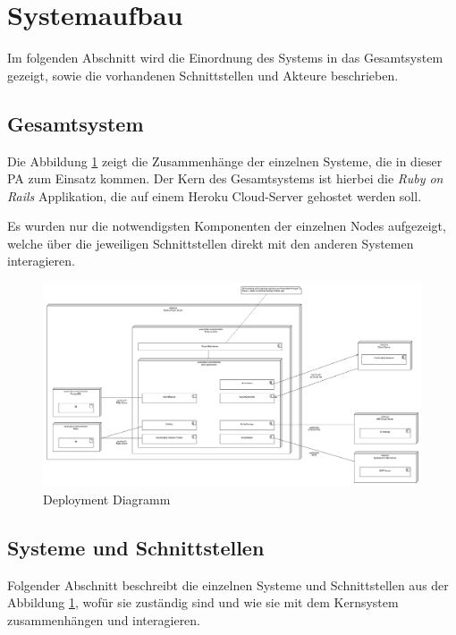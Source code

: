 \newpage

\section{Systemaufbau}

Im folgenden Abschnitt wird die Einordnung des Systems in das Gesamtsystem gezeigt, sowie die vorhandenen Schnittstellen und Akteure beschrieben.

\subsection{Gesamtsystem}

Die Abbildung \ref{fig:deployment} zeigt die Zusammenhänge der einzelnen Systeme, die in dieser PA zum Einsatz kommen.
Der Kern des Gesamtsystems ist hierbei die \emph{Ruby on Rails} Applikation, die auf einem Heroku Cloud-Server gehostet werden soll.

Es wurden nur die notwendigsten Komponenten der einzelnen Nodes aufgezeigt, welche über die jeweiligen Schnittstellen direkt mit den anderen Systemen interagieren.

\begin{figure}[H]
    \centering
    \includegraphics[width=\textwidth]{images/diagrams/deployment.png}
    \caption{\label{fig:deployment}Deployment Diagramm}
\end{figure}

\subsection{Systeme und Schnittstellen}

Folgender Abschnitt beschreibt die einzelnen Systeme und Schnittstellen aus der Abbildung \ref{fig:deployment},
wofür sie zuständig sind und wie sie mit dem Kernsystem zusammenhängen und interagieren.

